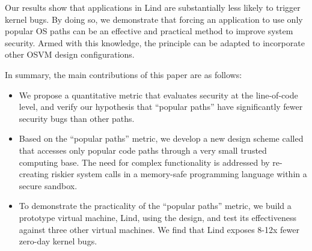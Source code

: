 Our results show that applications in Lind are substantially less likely to trigger kernel bugs.
By doing so, we demonstrate that forcing an application to use only popular
OS paths can be an effective and practical method to improve
system security. Armed with this knowledge, the \lip principle can be adapted to
incorporate other OSVM design configurations.

In summary, the main contributions of this paper are as follows:

\begin{itemize}\setlength\itemsep{0em}
\item
We propose a quantitative metric that evaluates security at the line-of-code level,
and verify our hypothesis that ``popular paths'' have significantly fewer security bugs than other paths.
\item
Based on the ``popular paths'' metric, we develop a new design scheme called \lip that accesses only popular code paths through a very small trusted computing base.
The need for complex functionality is addressed by re-creating riskier system calls in a memory-safe programming language within a secure sandbox.
\item
To demonstrate the practicality of the ``popular paths'' metric, we build a prototype virtual machine, Lind, using the \lip design,
and test its effectiveness against three other virtual machines. We find that Lind exposes 8-12x fewer zero-day kernel bugs.
\end{itemize}
